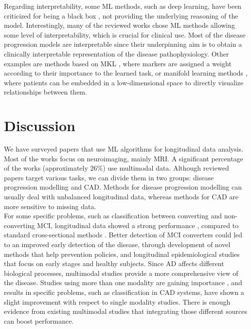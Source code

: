 Regarding interpretability, some ML methods, such as deep learning, have been criticized for being a black box \cite{Ching2018}, not providing the underlying reasoning of the model. Interestingly, many of the reviewed works chose ML methods allowing some level of interpretability, which is crucial for clinical use. Most of the disease progression models are interpretable since their underpinning aim is to obtain a clinically interpretable representation of the disease pathophysiology. Other examples are methods based on MKL \cite{Chen2015,Gonen2011,Zhang2012a}, where markers are assigned a weight according to their importance to the learned task, or manifold learning methods \cite{Guerrero2015,guerrero,Wolz2010}, where patients can be embedded in a low-dimensional space to directly visualize relationships between them.

\section{Discussion}
\label{sec:conclusion}

We have surveyed papers that use ML algorithms for longitudinal data analysis. Most of the works focus on neuroimaging, mainly MRI. A significant percentage of the works (approximately $26\%$) use multimodal data. Although reviewed papers target various tasks, we can divide them in two groups: disease progression modelling and CAD. Methods for disease progression modelling can usually deal with unbalanced longitudinal data, whereas methods for CAD are more sensitive to missing data. \\

For some specific problems, such as classification between converting and non-converting MCI, longitudinal data showed a strong performance \cite{Liu2013,Sun2017}, compared to standard cross-sectional methods \cite{cuingnet}. Better detection of MCI converters could led to an improved early detection of the disease, through development of novel methods that help prevention policies, and longitudinal epidemiological studies that focus on early stages and healthy subjects. Since AD affects different biological processes, multimodal studies provide a more comprehensive view of the disease. Studies using more than one modality are gaining importance \cite{Chen2015,Chi2017,Hinrichs2011,Minhas2016,Zhang2012a}, and results in specific problems, such as classification in CAD systems, have shown a slight improvement with respect to single modality studies. There is enough evidence from existing multimodal studies \cite{Iturria-Medina2016,Jedynak2012,Oxtoby2018} that integrating those different sources can boost performance. \\

